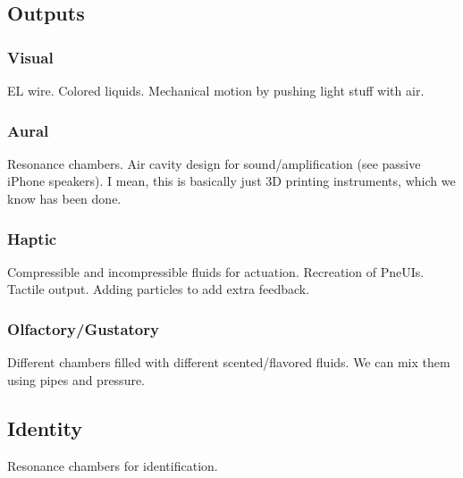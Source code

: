 \subsection{Outputs}

\subsubsection{Visual}
EL wire.  Colored liquids.  Mechanical motion by pushing light stuff with air.

\subsubsection{Aural}
Resonance chambers.  Air cavity design for sound/amplification (see passive iPhone speakers).  I mean, this is basically just 3D printing instruments, which we know has been done.

\subsubsection{Haptic}
Compressible and incompressible fluids for actuation.  Recreation of PneUIs.  Tactile output.  Adding particles to add extra feedback.

\subsubsection{Olfactory/Gustatory}
Different chambers filled with different scented/flavored fluids.  We can mix them using pipes and pressure.

\subsection{Identity}
Resonance chambers for identification.